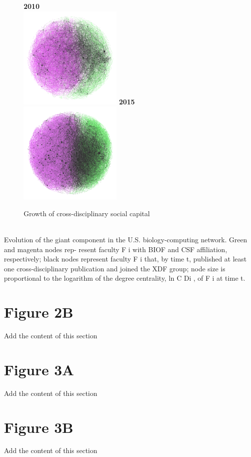 \documentclass[10pt]{article}         %
\begin{document}
\begin{figure}[!htb]
\endminipage\hfill
{}
  \textbf{2010}\\
  \includegraphics[width=5cm, height=5cm]{Fig2A2010.png}
\endminipage\hfill
{}%
  \textbf{2015}\\
  \includegraphics[width=5cm, height=5cm]{Fig2A2015.png}
\endminipage
\caption{Growth of cross-disciplinary social capital}\label{fig:s3}
\end{figure}\\
Evolution of the giant component in the U.S. biology-computing network. Green and magenta nodes rep- resent faculty F i with BIOF and CSF affiliation, respectively; black nodes represent faculty F i that, by time t, published at least one cross-disciplinary publication and joined the XDF group; node size is proportional to the logarithm of the degree centrality, ln C Di , of F i at time t.

\newpage
\section{Figure 2B}
Add the content of this section

\newpage
\section{Figure 3A}
Add the content of this section

\newpage
\section{Figure 3B}
Add the content of this section
\end{document}
